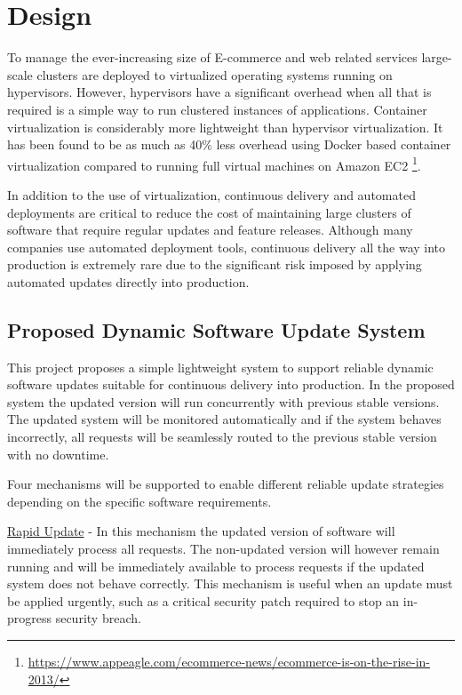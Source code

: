 \documentclass[a4paper,11pt,twoside]{article}
\begin{document}
\clearpage
\section{Design} \label{Design}
To manage the ever-increasing size of E-commerce and web related services large-scale clusters are deployed to virtualized operating systems running on hypervisors. However, hypervisors have a significant overhead when all that is required is a simple way to run clustered instances of applications. Container virtualization is considerably more lightweight than hypervisor virtualization. It has been found to be as much as 40\% less overhead using Docker based container virtualization compared to running full virtual machines on Amazon EC2 \footnote{\url{https://www.appeagle.com/ecommerce-news/ecommerce-is-on-the-rise-in-2013/}}.

In addition to the use of virtualization, continuous delivery and automated deployments are critical to reduce the cost of maintaining large clusters of software that require regular updates and feature releases. Although many companies use automated deployment tools, continuous delivery all the way into production is extremely rare due to the significant risk imposed by applying automated updates directly into production.

\subsection{Proposed Dynamic Software Update System}\label{modes} 
This project proposes a simple lightweight system to support reliable dynamic software updates suitable for continuous delivery into production. In the proposed system the updated version will run concurrently with previous stable versions. The updated system will be monitored automatically and if the system behaves incorrectly, all requests will be seamlessly routed to the previous stable version with no downtime.

Four mechanisms will be supported to enable different reliable update strategies depending on the specific software requirements.

\underline{Rapid Update} -  In this mechanism the updated version of software will immediately process all requests. The non-updated version will however remain running and will be immediately available to process requests if the updated system does not behave correctly. This mechanism is useful when an update must be applied urgently, such as a critical security patch required to stop an in-progress security breach.
\end{document}
